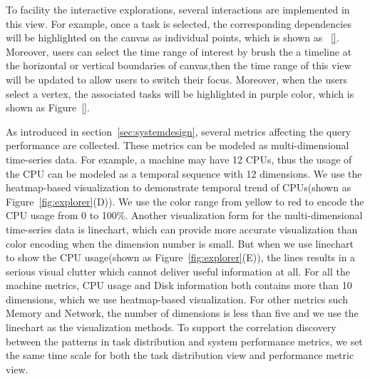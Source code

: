 To facility the interactive explorations, several interactions are implemented in this view. For example, once a task is selected, the corresponding dependencies will be highlighted on the canvas as individual points, which is shown as ~\ref{}. Moreover, users can select the time range of interest by brush the a timeline at the horizontal or vertical boundaries of canvas,then the time range of this view will be updated to allow users to switch their focus. Moreover, when the users select a vertex, the associated tasks will be highlighted in purple color, which is shown as Figure~\ref{}.

As introduced in section~\ref{sec:systemdesign}, several metrics affecting the query performance are collected. These metrics can be modeled as multi-dimensional time-series data. For example, a machine may have 12 CPUs, thus the usage of the CPU can be modeled as a temporal sequence with 12 dimensions. We use the heatmap-based visualization to demonstrate temporal trend of CPUs(shown as Figure~\ref{fig:explorer}(D)). We use the color range from yellow to red to encode the CPU usage from 0 to 100$\%$. Another visualization form for the multi-dimensional time-series data is linechart, which can provide more accurate visualization than color encoding when the dimension number is small. But when we use linechart to show the CPU usage(shown as Figure~\ref{fig:explorer}(E)), the lines results in a serious visual clutter which cannot deliver useful information at all. For all the machine metrics, CPU usage and Disk information both contains more than 10 dimensions, which we use heatmap-based visualization. For other metrics such Memory and Network, the number of dimensions is less than five and we use the linechart as the visualization methods. To support the correlation discovery between the patterns in task distribution and system performance metrics, we set the same time scale for both the task distribution view and performance metric view.

 


